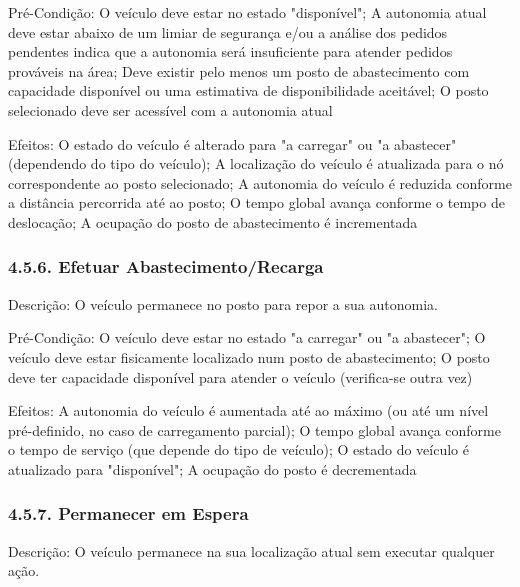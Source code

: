 \documentclass[a4paper]{article}
\begin{document}
\vspace{0.5cm}

\noindent Pré-Condição: O veículo deve estar no estado "disponível"; A autonomia atual deve estar abaixo de um limiar de segurança e/ou a análise dos pedidos pendentes indica que a autonomia será insuficiente para atender pedidos prováveis na área; Deve existir pelo menos um posto de abastecimento com capacidade disponível ou uma estimativa de disponibilidade aceitável; O posto selecionado deve ser acessível com a autonomia atual

\vspace{0.5cm}

\noindent Efeitos: O estado do veículo é alterado para "a carregar" ou "a abastecer" (dependendo do tipo do veículo); A localização do veículo é atualizada para o nó correspondente ao posto selecionado; A autonomia do veículo é reduzida conforme a distância percorrida até ao posto; O tempo global avança conforme o tempo de deslocação; A ocupação do posto de abastecimento é incrementada

\subsubsection*{4.5.6. Efetuar Abastecimento/Recarga}
\noindent Descrição: O veículo permanece no posto para repor a sua autonomia.

\vspace{0.5cm}

\noindent Pré-Condição: O veículo deve estar no estado "a carregar" ou "a abastecer"; O veículo deve estar fisicamente localizado num posto de abastecimento; O posto deve ter capacidade disponível para atender o veículo (verifica-se outra vez)

\vspace{0.5cm}

\noindent Efeitos: A autonomia do veículo é aumentada até ao máximo (ou até um nível pré-definido, no caso de carregamento parcial); O tempo global avança conforme o tempo de serviço (que depende do tipo de veículo); O estado do veículo é atualizado para "disponível"; A ocupação do posto é decrementada

\subsubsection*{4.5.7. Permanecer em Espera}
\noindent Descrição: O veículo permanece na sua localização atual sem executar qualquer ação.
\end{document}
